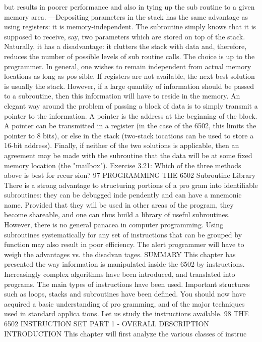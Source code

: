 but results in poorer performance and also in tying up the sub
routine to a given memory area.
—Depositing parameters in the stack has the same advantage as using
registers: it is memory-independent. The subroutine simply knows that
it is supposed to receive, say, two parameters which are stored on top
of the stack. Naturally, it has a disadvantage: it clutters the stack with
data and, therefore, reduces the number of possible levels of sub
routine calls.
The choice is up to the programmer. In general, one wishes to
remain independent from actual memory locations as long as pos
sible.
If registers are not available, the next best solution is usually
the stack. However, if a large quantity of information should be
passed to a subroutine, then this information will have to reside
in the memory. An elegant way around the problem of passing a
block of data is to simply transmit a pointer to the information. A
pointer is the address at the beginning of the block. A pointer can
be transmitted in a register (in the case of the 6502, this limits
the pointer to 8 bits), or else in the stack (two-stack iocations can
be used to store a 16-bit address).
Finally, if neither of the two solutions is applicable, then an
agreement may be made with the subroutine that the data will be
at some fixed memory location (the "mailbox").
Exercise 3.21: Which of the three methods above is best for recur
sion?
97
PROGRAMMING THE 6502
Subroutine Library
There is a strong advantage to structuring portions of a pro
gram into identifiable subroutines: they can be debugged inde
pendently and can have a mnemonic name. Provided that they
will be used in other areas of the program, they become shareable,
and one can thus build a library of useful subroutines. However,
there is no general panacea in computer programming. Using
subroutines systematically for any set of instructions that can be
grouped by function may also result in poor efficiency. The alert
programmer will have to weigh the advantages vs. the disadvan
tages.
SUMMARY
This chapter has presented the way information is manipulated
inside the 6502 by instructions. Increasingly complex algorithms
have been introduced, and translated into programs. The main
types of instructions have been used.
Important structures such as loops, stacks and subroutines
have been defined.
You should now have acquired a basic understanding of pro
gramming, and of the major techniques used in standard applica
tions. Let us study the instructions available.
98
THE 6502 INSTRUCTION SET
PART 1 - OVERALL DESCRIPTION
INTRODUCTION
This chapter will first analyze the various classes of instruc
